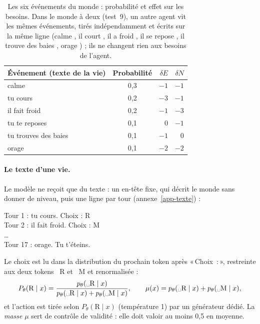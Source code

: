 \documentclass[11pt,a4paper]{article}
\newcommand{\Choix}{«\,Choix~:\,»}
\begin{document}
\begin{table}[t]
\centering
\caption{Les six événements du monde : probabilité et effet sur les besoins.
Dans le monde à deux (test~9), un autre agent vit les mêmes événements, tirés
indépendamment et écrits sur la même ligne (\og calme \fg{}, \og il court \fg{},
\og il a froid \fg{}, \og il se repose \fg{}, \og il trouve des baies \fg{},
\og orage \fg{}) ; ils ne changent rien aux besoins de l'agent.}
\label{tab-events}
\small
\begin{tabular}{@{}l c r r@{}}
\toprule
Événement (texte de la vie) & Probabilité & $\delta E$ & $\delta N$ \\
\midrule
calme & 0,3 & $-1$ & $-1$ \\
tu cours & 0,2 & $-3$ & $-1$ \\
il fait froid & 0,2 & $-1$ & $-3$ \\
tu te reposes & 0,1 & $0$ & $-1$ \\
tu trouves des baies & 0,1 & $-1$ & $0$ \\
orage & 0,1 & $-2$ & $-2$ \\
\bottomrule
\end{tabular}
\end{table}

\paragraph{Le texte d'une vie.} Le modèle ne reçoit que du texte : un en-tête
fixe, qui décrit le monde sans donner de niveau, puis une ligne par tour
(annexe~\ref{app-texte}) :
\begin{center}
\small\ttfamily
Tour 1 : tu cours. Choix : R\\
Tour 2 : il fait froid. Choix : M\\
\dots\\
Tour 17 : orage. Tu t'éteins.
\end{center}
Le choix est lu dans la distribution du prochain token après \Choix{},
restreinte aux deux tokens \og\ R\fg{} et \og\ M\fg{} et renormalisée :
\begin{equation}
P_\theta(\mathrm R\mid x)=\frac{p_\theta(\text{\textvisiblespace R}\mid x)}
{p_\theta(\text{\textvisiblespace R}\mid x)+p_\theta(\text{\textvisiblespace M}\mid x)},
\qquad
\mu(x)=p_\theta(\text{\textvisiblespace R}\mid x)+p_\theta(\text{\textvisiblespace M}\mid x),
\label{eq-pr}
\end{equation}
et l'action est tirée selon $P_\theta(\mathrm R\mid x)$ (température 1) par un
générateur dédié. La \emph{masse} $\mu$ sert de contrôle de validité : elle doit
valoir au moins 0,5 en moyenne.
\end{document}
